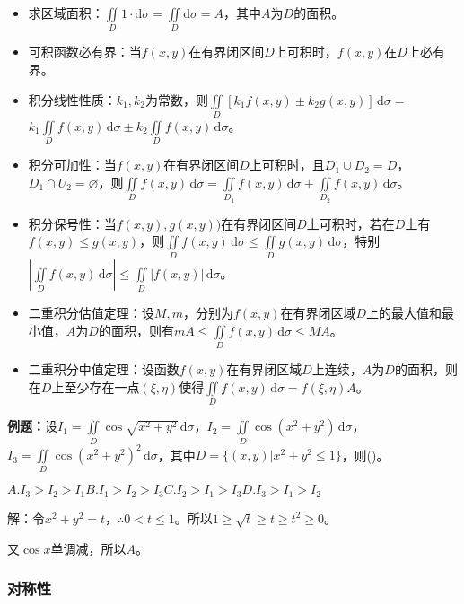 \documentclass[UTF8, 12pt]{ctexart}
\begin{document}
        \begin{itemize}
            \item 求区域面积：$\iint\limits_D1\cdot\textrm{d}\sigma=\iint\limits_D\textrm{d}\sigma=A$，其中$A$为$D$的面积。
            \item 可积函数必有界：当$f(x,y)$在有界闭区间$D$上可积时，$f(x,y)$在$D$上必有界。
            \item 积分线性性质：$k_1,k_2$为常数，则$\iint\limits_D[k_1f(x,y)\pm k_2g(x,y)]\,\textrm{d}\sigma=$\\$k_1\iint\limits_Df(x,y)\,\textrm{d}\sigma\pm k_2\iint\limits_Df(x,y)\,\textrm{d}\sigma$。
            \item 积分可加性：当$f(x,y)$在有界闭区间$D$上可积时，且$D_1\cup D_2=D$，$D_1\cap U_2=\varnothing$，则$\iint\limits_Df(x,y)\,\textrm{d}\sigma=\iint\limits_{D_1}f(x,y)\,\textrm{d}\sigma+\iint\limits_{D_2}f(x,y)\,\textrm{d}\sigma$。
            \item 积分保号性：当$f(x,y),g(x,y))$在有界闭区间$D$上可积时，若在$D$上有$f(x,y)\leqslant g(x,y)$，则$\iint\limits_Df(x,y)\,\textrm{d}\sigma\leqslant\iint\limits_Dg(x,y)\,\textrm{d}\sigma$，特别$\left\vert\iint\limits_Df(x,y)\,\textrm{d}\sigma\right\vert\leqslant\iint\limits_D\vert f(x,y)\vert\,\textrm{d}\sigma$。
            \item 二重积分估值定理：设$M,m$，分别为$f(x,y)$在有界闭区域$D$上的最大值和最小值，$A$为$D$的面积，则有$mA\leqslant\iint\limits_Df(x,y)\,\textrm{d}\sigma\leqslant MA$。
            \item 二重积分中值定理：设函数$f(x,y)$在有界闭区域$D$上连续，$A$为$D$的面积，则在$D$上至少存在一点$(\xi,\eta)$使得$\iint\limits_Df(x,y)\,\textrm{d}\sigma=f(\xi,\eta)A$。
        \end{itemize}

        \textbf{例题：}设$I_1=\iint\limits_D\cos\sqrt{x^2+y^2}\,\textrm{d}\sigma$，$I_2=\iint\limits_D\cos(x^2+y^2)\,\textrm{d}\sigma$，$I_3=\iint\limits_D\cos(x^2+y^2)^2\,\textrm{d}\sigma$，其中$D=\{(x,y)|x^2+y^2\leqslant1\}$，则()。

        $A.I_3>I_2>I_1$\qquad$B.I_1>I_2>I_3$\qquad$C.I_2>I_1>I_3$\qquad$D.I_3>I_1>I_2$

        解：令$x^2+y^2=t$，$\therefore0<t\leqslant1$。所以$1\geqslant\sqrt{t}\geqslant t\geqslant t^2\geqslant0$。

        又$\cos x$单调减，所以$A$。

        \subsubsection{对称性}
\end{document}
